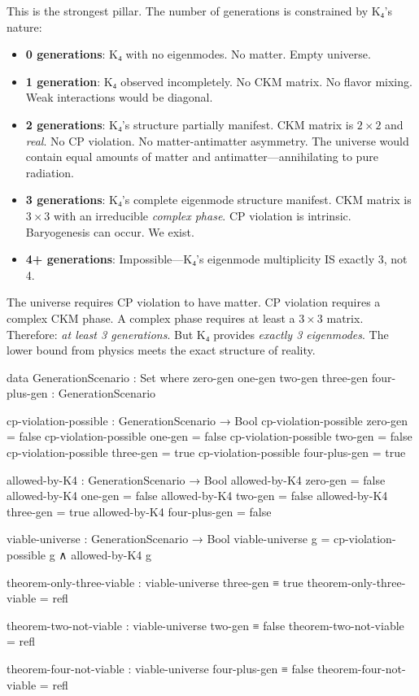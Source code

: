 \documentclass[11pt,a4paper]{book}
\begin{document}
This is the strongest pillar. The number of generations is constrained by K₄'s nature:

\begin{itemize}
\item \textbf{0 generations}: K₄ with no eigenmodes. No matter. Empty universe.
\item \textbf{1 generation}: K₄ observed incompletely. No CKM matrix. No flavor mixing. Weak interactions would be diagonal.
\item \textbf{2 generations}: K₄'s structure partially manifest. CKM matrix is $2 \times 2$ and \emph{real}. No CP violation. No matter-antimatter asymmetry. The universe would contain equal amounts of matter and antimatter—annihilating to pure radiation.
\item \textbf{3 generations}: K₄'s complete eigenmode structure manifest. CKM matrix is $3 \times 3$ with an irreducible \emph{complex phase}. CP violation is intrinsic. Baryogenesis can occur. We exist.
\item \textbf{4+ generations}: Impossible—K₄'s eigenmode multiplicity IS exactly 3, not 4.
\end{itemize}

The universe requires CP violation to have matter. CP violation requires a complex CKM phase. A complex phase requires at least a $3 \times 3$ matrix. Therefore: \emph{at least 3 generations}. But K₄ provides \emph{exactly 3 eigenmodes}. The lower bound from physics meets the exact structure of reality.

\begin{code}
data GenerationScenario : Set where
  zero-gen one-gen two-gen three-gen four-plus-gen : GenerationScenario

cp-violation-possible : GenerationScenario → Bool
cp-violation-possible zero-gen      = false
cp-violation-possible one-gen       = false
cp-violation-possible two-gen       = false
cp-violation-possible three-gen     = true
cp-violation-possible four-plus-gen = true

allowed-by-K4 : GenerationScenario → Bool
allowed-by-K4 zero-gen      = false
allowed-by-K4 one-gen       = false
allowed-by-K4 two-gen       = false
allowed-by-K4 three-gen     = true
allowed-by-K4 four-plus-gen = false

viable-universe : GenerationScenario → Bool
viable-universe g = cp-violation-possible g ∧ allowed-by-K4 g

theorem-only-three-viable : viable-universe three-gen ≡ true
theorem-only-three-viable = refl

theorem-two-not-viable : viable-universe two-gen ≡ false
theorem-two-not-viable = refl

theorem-four-not-viable : viable-universe four-plus-gen ≡ false
theorem-four-not-viable = refl
\end{code}
\end{document}
